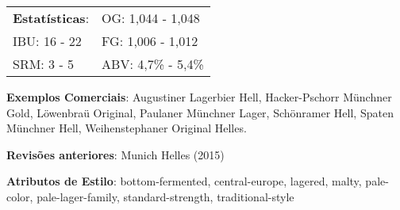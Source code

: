 \begin{tabular}{@{}p{35mm}p{35mm}@{}}
  \textbf{Estatísticas}: & OG: 1,044 - 1,048 \\
  IBU: 16 - 22  & FG: 1,006 - 1,012  \\
  SRM: 3 - 5   & ABV: 4,7\% - 5,4\%
\end{tabular}

\textbf{Exemplos Comerciais}: Augustiner Lagerbier Hell, Hacker-Pschorr Münchner Gold, Löwenbraü Original, Paulaner Münchner Lager, Schönramer Hell, Spaten Münchner Hell, Weihenstephaner Original Helles.

\textbf{Revisões anteriores}: Munich Helles (2015)

\textbf{Atributos de Estilo}: bottom-fermented, central-europe, lagered, malty, pale-color, pale-lager-family, standard-strength, traditional-style

